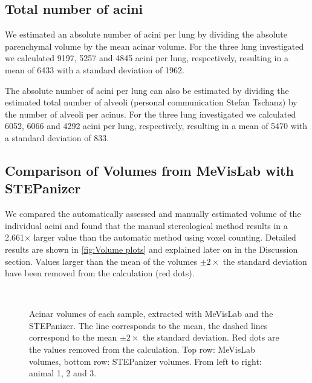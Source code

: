 \documentclass[a4paper,DIV=calc,abstract,english]{scrartcl}
\newcommand{\biggerthan}{2} %
\newcommand{\totalnumberofaciniB}{9197}
\newcommand{\totalnumberofaciniD}{5257}
\newcommand{\totalnumberofaciniE}{4845}
\newcommand{\meantotalnumberofacini}{6433}
\newcommand{\meantotalnumberofaciniSTD}{1962} %
\newcommand{\totalnumberofaciniBVariant}{6052}
\newcommand{\totalnumberofaciniDVariant}{6066}
\newcommand{\totalnumberofaciniEVariant}{4292}
\newcommand{\meantotalnumberofaciniVariant}{5470}
\newcommand{\meantotalnumberofaciniSTDVariant}{833} %
\newcommand{\difference}{2.661} %
\begin{document}
\subsection{Total number of acini}
We estimated an absolute number of acini per lung by dividing the absolute parenchymal volume by the mean acinar volume.
For the three lung investigated we calculated \totalnumberofaciniB, \totalnumberofaciniD\xspace and \totalnumberofaciniE\xspace acini per lung, respectively, resulting in a mean of \meantotalnumberofacini\xspace with a standard deviation of \meantotalnumberofaciniSTD.

The absolute number of acini per lung can also be estimated by dividing the estimated total number of alveoli (personal communication Stefan Tschanz) by the number of alveoli per acinus.
For the three lung investigated we calculated \totalnumberofaciniBVariant, \totalnumberofaciniDVariant\xspace and \totalnumberofaciniEVariant\xspace acini per lung, respectively, resulting in a mean of \meantotalnumberofaciniVariant\xspace with a standard deviation of \meantotalnumberofaciniSTDVariant.

\subsection{Comparison of Volumes from MeVisLab with STEPanizer}
We compared the automatically assessed and manually estimated volume of the individual acini and found that the manual stereological method results in a \difference\(\times\) larger value than the automatic method using voxel counting.
Detailed results are shown in \autoref{fig:Volume plots} and explained later on in the Discussion section.
Values larger than the mean of the volumes \(\pm\biggerthan\times\) the standard deviation have been removed from the calculation (red dots).

\begin{figure}[htb]
	\centering
	\subfloat{
		}\hfill%
	\subfloat{
		
		}\hfill%
	\subfloat{
		
		}\\%
	\subfloat{
		
		}\hfill%
	\subfloat{
		
		}\hfill%
	\subfloat{
		
		}%
	\caption{Acinar volumes of each sample, extracted with MeVisLab and the STEPanizer. The line corresponds to the mean, the dashed lines correspond to the mean \(\pm\biggerthan\times\) the standard deviation. Red dots are the values removed from the calculation. Top row: MeVisLab volumes, bottom row: STEPanizer volumes. From left to right: animal 1, 2 and 3.}
	\label{fig:Volume plots}
\end{figure}
\end{document}

